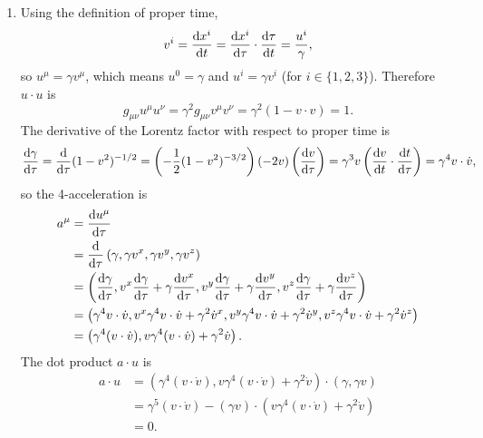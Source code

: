\documentclass{article}
\begin{document}
\bigskip
\par
\begin{prob}
\end{prob}
\begin{enumerate}[label=(\alph*)]
    \item Using the definition of proper time,
        \[ v^i = \frac{\mathrm{d} x^i}{\mathrm{d} t} = \frac{\mathrm{d} x^i}{\mathrm{d} \tau} \cdot \frac{\mathrm{d} \tau}{\mathrm{d} t} = \frac{u^i}{\gamma}, \]
        so $u^\mu = \gamma v^\mu$, which means $u^0=\gamma$ and $u^i=\gamma v^i$ (for $i \in \{1,2,3\}$). Therefore $u \cdot u$ is
        \[ g_{\mu \nu} u^\mu u^\nu = \gamma^2 g_{\mu \nu} v^\mu v^\nu = \gamma^2 \left( 1 - v \cdot v \right) = 1. \]
        The derivative of the Lorentz factor with respect to proper time is
        \[ \frac{\mathrm{d} \gamma}{\mathrm{d} \tau} = \frac{\mathrm{d}}{\mathrm{d} \tau} (1-v^2)^{-1/2} = \left( - \frac{1}{2} (1-v^2)^{-3/2} \right) \left( -2v \right) \left( \frac{\mathrm{d} v}{\mathrm{d} \tau} \right) = \gamma^3 v \left( \frac{\mathrm{d} v}{\mathrm{d} t} \cdot \frac{\mathrm{d} t}{\mathrm{d} \tau} \right) = \gamma^4 v \cdot \dot{v}, \]
        so the 4-acceleration is
        \begin{align*}
        a^\mu &= \frac{\mathrm{d} u^\mu}{\mathrm{d} \tau} \\
              &= \frac{\mathrm{d}}{\mathrm{d} \tau} \left( \gamma, \gamma v^x, \gamma v^y, \gamma v^z \right) \\
              &= \left( \frac{\mathrm{d} \gamma}{\mathrm{d} \tau}, v^x \frac{\mathrm{d} \gamma}{\mathrm{d} \tau} + \gamma \frac{\mathrm{d} v^x}{\mathrm{d} \tau}, v^y \frac{\mathrm{d} \gamma}{\mathrm{d} \tau} + \gamma \frac{\mathrm{d} v^y}{\mathrm{d} \tau}, v^z \frac{\mathrm{d} \gamma}{\mathrm{d} \tau} + \gamma \frac{\mathrm{d} v^z}{\mathrm{d} \tau} \right) \\
              &= \left( \gamma^4 v \cdot \dot{v}, v^x \gamma^4 v \cdot \dot{v} + \gamma^2 \dot{v}^x, v^y \gamma^4 v \cdot \dot{v} + \gamma^2 \dot{v}^y, v^z \gamma^4 v \cdot \dot{v} + \gamma^2 \dot{v}^z \right) \\
              &= \left( \gamma^4 (v \cdot \dot{v}), v \gamma^4 (v \cdot \dot{v}) + \gamma^2 \dot{v} \right).
        \end{align*}
        The dot product $a \cdot u$ is
        \begin{align*}
        a\cdot u &= \left( \gamma^4 (v \cdot \dot{v}), v \gamma^4 (v \cdot \dot{v}) + \gamma^2 \dot{v} \right) \cdot \left( \gamma, \gamma v \right) \\
                 &= \gamma^5(v\cdot \dot{v}) - (\gamma v) \cdot (v \gamma^4(v \cdot \dot{v})+ \gamma^2 \dot{v}) \\
                 &= 0.
        \end{align*}

\end{enumerate}
\end{document}
